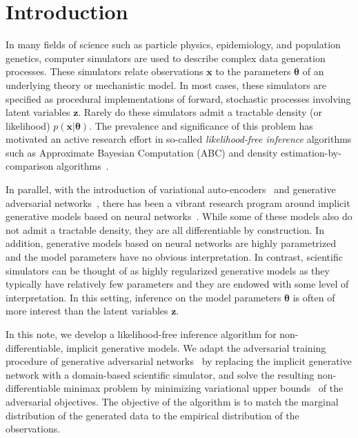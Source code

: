 \documentclass{article}
\newcommand{\bftheta}{{\bm \theta}}
\newcommand{\bfx}{\mathbf{x}}
\newcommand{\bfz}{\mathbf{z}}
\theoremstyle{plain}
\begin{document}

\section{Introduction}

In many fields of science such as particle physics, epidemiology,  and
population genetics, computer simulators are used to describe complex data
generation processes. These simulators relate observations $\bfx$ to the
parameters $\bftheta$ of an underlying theory or mechanistic model. In most
cases, these simulators are specified as procedural implementations of forward,
stochastic processes involving latent variables $\bfz$. Rarely do these
simulators admit a tractable density (or likelihood) $p(\bfx | \bftheta)$. The
prevalence and significance of this problem has motivated an active research
effort in so-called \textit{likelihood-free inference} algorithms such as
Approximate Bayesian Computation (ABC) and density estimation-by-comparison
algorithms~\cite{beaumont2002approximate, marjoram2003markov,
sisson2007sequential, sisson2011likelihood, marin2012approximate,
cranmer2015approximating}.

In parallel, with the introduction of variational
auto-encoders~\cite{DBLP:journals/corr/KingmaW13} and generative adversarial
networks~\cite{goodfellow2014generative}, there has been a vibrant research
program around implicit generative models based on neural
networks~\cite{2016arXiv161003483M}.  While some of these models
also do not admit a tractable density, they are all differentiable by construction.
In addition, generative models based on neural networks are highly parametrized and the model
parameters have no obvious interpretation. In contrast, scientific simulators
can be thought of as highly regularized generative models as they typically have
relatively few parameters and they are endowed with some level of
interpretation. In this setting, inference on the model parameters $\bftheta$ is
often of more interest than the latent variables $\bfz$.

In this note, we develop a likelihood-free inference algorithm
for non-differentiable, implicit generative models.
We adapt the adversarial
training procedure of generative adversarial
networks~\cite{goodfellow2014generative} by replacing the implicit generative
network with a domain-based scientific simulator, and solve the resulting
non-differentiable minimax problem by minimizing variational upper
bounds~\cite{2011arXiv1106.4487W,2012arXiv1212.4507S} of the adversarial
objectives.
The objective of the algorithm is to match the marginal distribution of
the generated data to the empirical distribution of the observations.
\end{document}
